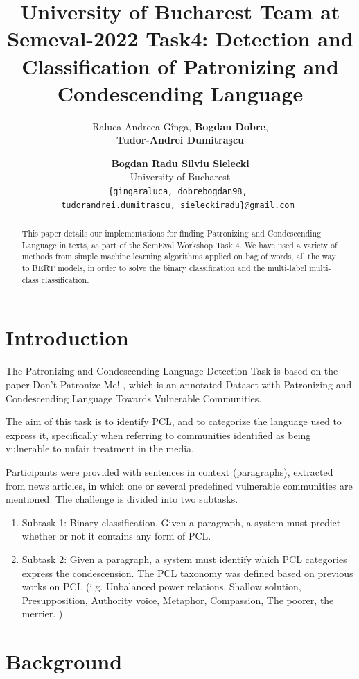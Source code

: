 \documentclass[11pt]{article}
\title{University of Bucharest Team at Semeval-2022 Task4: Detection and
	Classification of Patronizing and Condescending Language}
\author{Raluca Andreea G\^inga, {\bf Bogdan Dobre},  \\  {\bf Tudor-Andrei Dumitra\c{s}cu} \and {\bf Bogdan Radu Silviu Sielecki}\\
University of Bucharest \\
\texttt{\{gingaraluca, dobrebogdan98, }\\
\texttt{tudorandrei.dumitrascu, sieleckiradu\}@gmail.com }
}
\begin{document}
\maketitle

\begin{abstract}
	This paper details our implementations for finding Patronizing and
	Condescending Language in texts, as part of the SemEval Workshop Task 4.
	We have used a variety of methods from simple machine learning algorithms applied
	on bag of words, all the way to BERT models, in order to solve the binary classification
	and the multi-label multi-class classification.
\end{abstract}

\section{Introduction}

The Patronizing and Condescending Language Detection Task \cite{perezalmendros2022semeval} is based on the
paper Don't Patronize Me! \cite{perezalmendros2020dont}, which is an annotated Dataset with Patronizing and
Condescending Language Towards Vulnerable Communities.

The aim of this task is to identify PCL, and to categorize the language
used to express it, specifically when referring to communities
identified as being vulnerable to unfair treatment in the media.

Participants were provided with sentences in context (paragraphs), extracted
from news articles, in which one or several predefined vulnerable
communities are mentioned. The challenge is divided into two subtasks.

\begin{enumerate}
	\item Subtask 1: Binary classification. Given a paragraph, a system must
	      predict whether or not it contains any form of PCL.

	\item Subtask 2: Given a paragraph, a system must identify which PCL
	      categories express the condescension. The PCL taxonomy was defined
	      based on previous works on PCL (i.g. Unbalanced power relations, Shallow
	      solution, Presupposition, Authority voice, Metaphor, Compassion, The poorer,
	      the merrier. )
\end{enumerate}


\section{Background}
\end{document}
